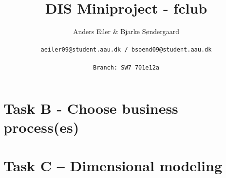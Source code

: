 \documentclass[a4paper,10pt]{article}
\title{DIS Miniproject - fclub}
\author{Anders Eiler \& Bjarke Søndergaard \\
\rule{0pt}{4ex}\texttt{aeiler09@student.aau.dk / bsoend09@student.aau.dk} \\
\rule{0pt}{4ex}\texttt{Branch: SW7 701e12a}}
\begin{document}
    \maketitle
    \newpage


    \section{Task B - Choose business process(es)}
    

    \section{Task C – Dimensional modeling}
    



\end{document}
